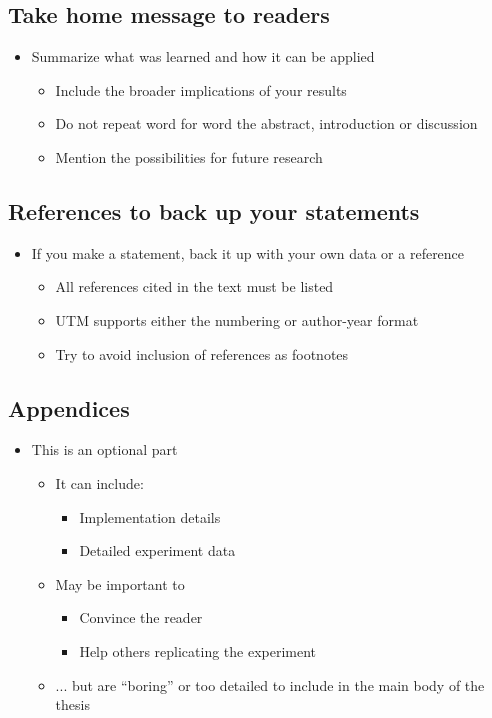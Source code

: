 \documentclass{utmthesis}
\begin{document}
\subsection{Take home message to readers}
\begin{itemize}
\item Summarize what was learned and how it can be applied 
\begin{itemize}
\item Include the broader implications of your results
\item Do not repeat word for word the abstract, introduction or discussion
\item Mention the possibilities for future research
\end{itemize}
\end{itemize}

\subsection{References to back up your statements}
\begin{itemize}
\item If you make a statement, back it up with your own data or a reference
\begin{itemize}
\item All references cited in the text must be listed
\item UTM supports either the numbering or author-year format
\item Try to avoid inclusion of references as footnotes
\end{itemize}
\end{itemize}

\subsection{Appendices}
\begin{itemize}
\item This is an optional part
\begin{itemize}
\item It can include:
\begin{itemize}
\item Implementation details
\item Detailed experiment data
\end{itemize}
\item May be important to
\begin{itemize}
\item Convince the reader
\item Help others replicating the experiment
\end{itemize}
\item ... but are \textquotedblleft boring\textquotedblright{} or too detailed
to include in the main body of the thesis
\end{itemize}
\end{itemize}
\end{document}
